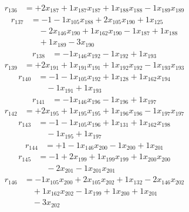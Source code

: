 \[\begin{aligned}
r_{136} &= + 2 x_{187} + 1 x_{187} x_{187} + 1 x_{188} x_{188} - 1 x_{189} x_{189}
\end{aligned}\]
\[\begin{aligned}
r_{137} &= - 1 - 1 x_{105} x_{188} + 2 x_{105} x_{190} + 1 x_{125} \\
 &\quad - 2 x_{146} x_{190} + 1 x_{162} x_{190} - 1 x_{187} + 1 x_{188} \\
 &\quad + 1 x_{189} - 3 x_{190}
\end{aligned}\]
\[\begin{aligned}
r_{138} &= - 1 x_{146} x_{192} - 1 x_{192} + 1 x_{193}
\end{aligned}\]
\[\begin{aligned}
r_{139} &= + 2 x_{191} + 1 x_{191} x_{191} + 1 x_{192} x_{192} - 1 x_{193} x_{193}
\end{aligned}\]
\[\begin{aligned}
r_{140} &= - 1 - 1 x_{105} x_{192} + 1 x_{128} + 1 x_{162} x_{194} \\
 &\quad - 1 x_{191} + 1 x_{193}
\end{aligned}\]
\[\begin{aligned}
r_{141} &= - 1 x_{146} x_{196} - 1 x_{196} + 1 x_{197}
\end{aligned}\]
\[\begin{aligned}
r_{142} &= + 2 x_{195} + 1 x_{195} x_{195} + 1 x_{196} x_{196} - 1 x_{197} x_{197}
\end{aligned}\]
\[\begin{aligned}
r_{143} &= - 1 - 1 x_{105} x_{196} + 1 x_{131} + 1 x_{162} x_{198} \\
 &\quad - 1 x_{195} + 1 x_{197}
\end{aligned}\]
\[\begin{aligned}
r_{144} &= + 1 - 1 x_{146} x_{200} - 1 x_{200} + 1 x_{201}
\end{aligned}\]
\[\begin{aligned}
r_{145} &= - 1 + 2 x_{199} + 1 x_{199} x_{199} + 1 x_{200} x_{200} \\
 &\quad - 2 x_{201} - 1 x_{201} x_{201}
\end{aligned}\]
\[\begin{aligned}
r_{146} &= - 1 x_{105} x_{200} + 2 x_{105} x_{202} + 1 x_{132} - 2 x_{146} x_{202} \\
 &\quad + 1 x_{162} x_{202} - 1 x_{199} + 1 x_{200} + 1 x_{201} \\
 &\quad - 3 x_{202}
\end{aligned}\]
